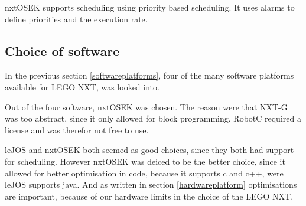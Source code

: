 
nxtOSEK supports scheduling using priority based scheduling. It uses alarms to define priorities and the execution rate.

\subsection{Choice of software}
In the previous section \ref{softwareplatforms}, four of the many software platforms available for LEGO NXT, was looked into.

Out of the four software, nxtOSEK was chosen. The reason were that NXT-G was too abstract, since it only allowed for block programming. RobotC required a license and was therefor not free to use. 

leJOS and nxtOSEK both seemed as good choices, since they both had support for scheduling. However nxtOSEK was deiced to be the better choice, since it allowed for better optimisation in code, because it supports c and c++, were leJOS supports java. And as written in section \ref{hardwareplatform} optimisations are important, because of our hardware limits in the choice of the LEGO NXT.  




